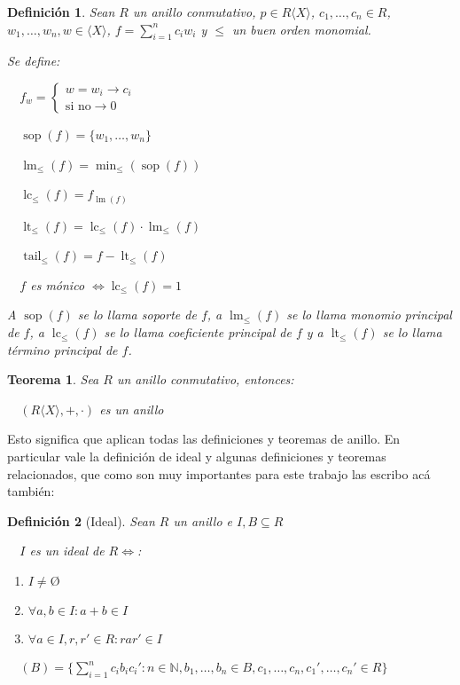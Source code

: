 \documentclass{amsbook}
\theoremstyle{customstyle}
\newtheorem{definition}{Definición}[section]
\newtheorem{theorem}{Teorema}[section]
\DeclareMathOperator{\sop}{sop}
\DeclareMathOperator{\lm}{lm}
\DeclareMathOperator{\lc}{lc}
\DeclareMathOperator{\lt}{lt}
\DeclareMathOperator{\tail}{tail}
\begin{document}
\begin{definition}
Sean $R$ un anillo conmutativo, $p ∈ R⟨X⟩$, $c_1, …, c_n ∈ R$, $w_1, …, w_n, w ∈ ⟨X⟩$, $f = \sum_{i = 1}^n c_i w_i$ y $≤$ un buen orden monomial.

Se define:

  $f_w = \left\{\begin{array}{ll} w = w_i → c_i \\ \text{si no} → 0  \end{array} \right. $

  $\sop(f) = \{w_1, …, w_n\}$

  $\lm_≤(f) = \min_≤(\sop(f))$

  $\lc_≤(f) = f_{\lm(f)}$

  $\lt_≤(f) = \lc_≤(f) · \lm_≤(f)$

  $\tail_≤(f) = f - \lt_≤(f)$

  $f$ es mónico $⇔ \lc_≤(f) = 1$

A $\sop(f)$ se lo llama soporte de $f$, a $\lm_≤(f)$ se lo llama monomio principal de $f$, a $\lc_≤(f)$ se lo llama coeficiente principal de $f$ y a $\lt_≤(f)$ se lo llama término principal de $f$.

\end{definition}

\begin{theorem}
Sea $R$ un anillo conmutativo, entonces:

  $(R⟨X⟩, +, ·)$ es un anillo

\end{theorem}

Esto significa que aplican todas las definiciones y teoremas de anillo.
En particular vale la definición de ideal y algunas definiciones y teoremas relacionados, que como son muy importantes para este trabajo las escribo acá también:

\begin{definition}[Ideal]\label{def:ideal}
Sean $R$ un anillo e $I, B ⊆ R$

  $I$ es un ideal de $R ⇔$:
\begin{enumerate}[label = (\alph*)]
\item $I ≠ Ø$

\item $∀a, b ∈ I : a + b ∈ I$

\item $∀a ∈ I, r, r' ∈ R : rar' ∈ I$
\end{enumerate}

  $(B) = \{\sum_{i = 1}^n c_i b_i c_i' : n ∈ ℕ, b_1, …, b_n ∈ B, c_1, …, c_n, c_1', …, c_n' ∈ R\}$
\end{definition}
\end{document}
